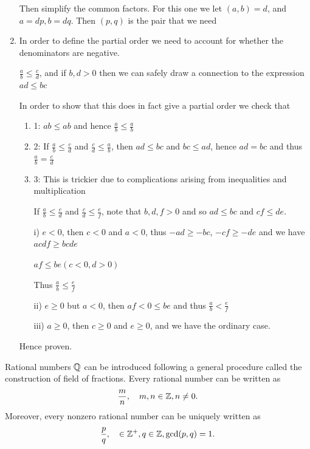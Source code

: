 \begin{solution}
\begin{enumerate}[label=(\alph*)]
Then simplify the common factors. For this one we let $(a,b)=d$, and $a=dp,b=dq$. Then $(p,q)$ is the pair that we need

\item In order to define the partial order we need to account for whether the denominators are negative.

$\frac{a}{b} \le \frac{c}{d}$, and if $b,d>0$ then we can safely draw a connection to the expression $ad \le bc$

In order to show that this does in fact give a partial order we check that
\begin{enumerate}
\item 1: $ab \le ab$ and hence $\frac{a}{b} \le \frac{a}{b}$

\item 2: If $\frac{a}{b} \le \frac{c}{d}$ and $\frac{c}{d} \le \frac{a}{b}$, then $ad \le bc$ and $bc \le ad$, hence $ad=bc$ and thus $\frac{a}{b}=\frac{c}{d}$

\item 3: This is trickier due to complications arising from inequalities and multiplication

If $\frac{a}{b}\le\frac{c}{d}$ and $\frac{c}{d}\le\frac{e}{f}$, note that $b,d,f>0$ and so $ad \le bc$ and $cf \le de$.

i) $e<0$, then $c<0$ and $a<0$, thus $-ad \ge -bc$, $-cf \ge -de$ and we have $acdf \ge bcde$

$af \le be (c<0,d>0)$

Thus $\frac{a}{b} \le \frac{e}{f}$

ii) $e \ge 0$ but $a<0$, then $af<0 \le be$ and thus $\frac{a}{b}<\frac{e}{f}$

iii) $a \ge 0$, then $c \ge 0$ and $e \ge 0$, and we have the ordinary case.
\end{enumerate}

Hence proven.
\end{enumerate}
\end{solution}


Rational numbers $\mathbb Q$ can be introduced following a general procedure called the construction of field of fractions. Every rational number can be written as
\[ \frac{m}{n}, \quad m,n\in\mathbb Z,n\neq0. \]
Moreover, every nonzero rational number can be uniquely written as
\[ \frac{p}{q}, \quad \in\mathbb Z^+,q\in\mathbb Z,\gcd(p,q)=1. \]

